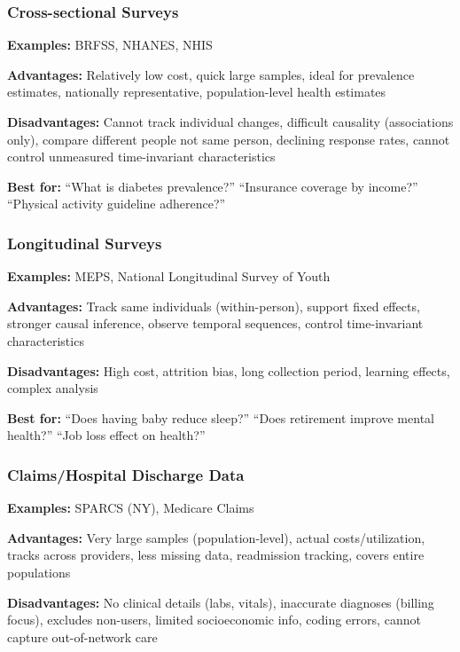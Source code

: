 ﻿\documentclass[8pt,letterpaper]{article}
\begin{document}
\begin{multicols}{2}
\subsubsection{Cross-sectional Surveys}

\textbf{Examples:} BRFSS, NHANES, NHIS

\textbf{Advantages:} Relatively low cost, quick large samples, ideal for prevalence estimates, nationally representative, population-level health estimates

\textbf{Disadvantages:} Cannot track individual changes, difficult causality (associations only), compare different people not same person, declining response rates, cannot control unmeasured time-invariant characteristics

\textbf{Best for:} ``What is diabetes prevalence?'' ``Insurance coverage by income?'' ``Physical activity guideline adherence?''

\subsubsection{Longitudinal Surveys}

\textbf{Examples:} MEPS, National Longitudinal Survey of Youth

\textbf{Advantages:} Track same individuals (within-person), support fixed effects, stronger causal inference, observe temporal sequences, control time-invariant characteristics

\textbf{Disadvantages:} High cost, attrition bias, long collection period, learning effects, complex analysis

\textbf{Best for:} ``Does having baby reduce sleep?'' ``Does retirement improve mental health?'' ``Job loss effect on health?''

\subsubsection{Claims/Hospital Discharge Data}

\textbf{Examples:} SPARCS (NY), Medicare Claims

\textbf{Advantages:} Very large samples (population-level), actual costs/utilization, tracks across providers, less missing data, readmission tracking, covers entire populations

\textbf{Disadvantages:} No clinical details (labs, vitals), inaccurate diagnoses (billing focus), excludes non-users, limited socioeconomic info, coding errors, cannot capture out-of-network care


\end{multicols}
\end{document}
